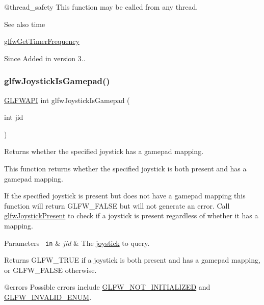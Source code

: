 @thread\+\_\+safety This function may be called from any thread.

\begin{DoxySeeAlso}{See also}
time 

\mbox{\hyperlink{group__input_gaa92d10b10013372778efbf6367714371}{glfw\+Get\+Timer\+Frequency}}
\end{DoxySeeAlso}
\begin{DoxySince}{Since}
Added in version 3.. 
\end{DoxySince}
\mbox{\label{group__input_gac9720b6e5062a5fc5fc0bb4be6dc04a0}} 
\subsubsection{\texorpdfstring{glfwJoystickIsGamepad()}{glfwJoystickIsGamepad()}}
{\footnotesize\ttfamily \mbox{\hyperlink{glfw3_8h_a56da5036b2cc259351ae22fd6439bb47}{G\+L\+F\+W\+A\+PI}} int glfw\+Joystick\+Is\+Gamepad (\begin{DoxyParamCaption}\item[{int}]{jid }\end{DoxyParamCaption})}



Returns whether the specified joystick has a gamepad mapping. 

This function returns whether the specified joystick is both present and has a gamepad mapping.

If the specified joystick is present but does not have a gamepad mapping this function will return {\ttfamily G\+L\+F\+W\+\_\+\+F\+A\+L\+SE} but will not generate an error. Call \mbox{\hyperlink{group__input_gacb1b7dfd79df673d48814c06fc436eff}{glfw\+Joystick\+Present}} to check if a joystick is present regardless of whether it has a mapping.


\begin{DoxyParams}[1]{Parameters}
\mbox{\texttt{ in}}  & {\em jid} & The \mbox{\hyperlink{group__joysticks}{joystick}} to query. \\
\hline
\end{DoxyParams}
\begin{DoxyReturn}{Returns}
{\ttfamily G\+L\+F\+W\+\_\+\+T\+R\+UE} if a joystick is both present and has a gamepad mapping, or {\ttfamily G\+L\+F\+W\+\_\+\+F\+A\+L\+SE} otherwise.
\end{DoxyReturn}
@errors Possible errors include \mbox{\hyperlink{group__errors_ga2374ee02c177f12e1fa76ff3ed15e14a}{G\+L\+F\+W\+\_\+\+N\+O\+T\+\_\+\+I\+N\+I\+T\+I\+A\+L\+I\+Z\+ED}} and \mbox{\hyperlink{group__errors_ga76f6bb9c4eea73db675f096b404593ce}{G\+L\+F\+W\+\_\+\+I\+N\+V\+A\+L\+I\+D\+\_\+\+E\+N\+UM}}.

